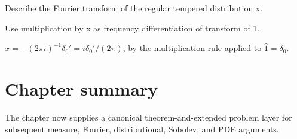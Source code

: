 \begin{exercise}[Transform of x]\label{exr:iii19-expand-16}
Describe the Fourier transform of the regular tempered distribution x.
\end{exercise}
\begin{hint}
Use multiplication by x as frequency differentiation of transform of 1.
\end{hint}
\begin{solution}
$\widehat{x}=-(2\pi i)^{-1}\delta_0'=i\delta_0'/(2\pi)$, by the multiplication rule applied to $\widehat1=\delta_0$.
\end{solution}
\section*{Chapter summary}
The chapter now supplies a canonical theorem-and-extended problem layer for subsequent measure, Fourier, distributional, Sobolev, and PDE arguments.
